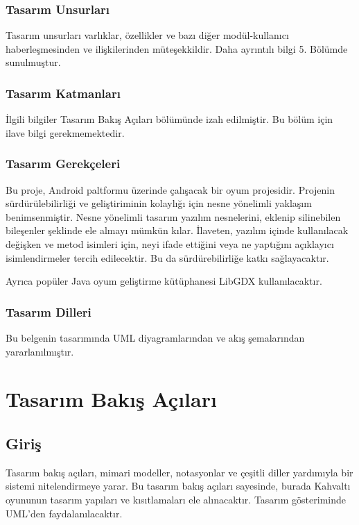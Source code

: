 \documentclass[12pt,a4paper]{article}
\begin{document}
   \subsubsection{Tasarım Unsurları}
   Tasarım unsurları varlıklar, özellikler ve bazı diğer modül-kullanıcı haberleşmesinden ve ilişkilerinden müteşekkildir. Daha ayrıntılı bilgi 5. Bölümde sunulmuştur.

   \subsubsection{Tasarım Katmanları}
   İlgili bilgiler Tasarım Bakış Açıları bölümünde izah edilmiştir. Bu bölüm için ilave bilgi gerekmemektedir.

   \subsubsection{Tasarım Gerekçeleri}
   Bu proje, Android paltformu üzerinde çalışacak bir oyum projesidir. Projenin sürdürülebilirliği ve geliştiriminin kolaylığı için nesne yönelimli yaklaşım benimsenmiştir. Nesne yönelimli tasarım yazılım nesnelerini, eklenip silinebilen bileşenler şeklinde ele almayı mümkün kılar. İlaveten, yazılım içinde kullanılacak değişken ve metod isimleri için, neyi ifade ettiğini veya ne yaptığını açıklayıcı isimlendirmeler tercih edilecektir. Bu da sürdürebilirliğe katkı sağlayacaktır.

   Ayrıca popüler Java oyum geliştirme kütüphanesi LibGDX kullanılacaktır.

   \subsubsection{Tasarım Dilleri}
   Bu belgenin tasarımında UML diyagramlarından ve akış şemalarından yararlanılmıştır.

   \section{Tasarım Bakış Açıları}

   \subsection{Giriş}
   Tasarım bakış açıları, mimari modeller, notasyonlar ve çeşitli diller yardımıyla bir sistemi nitelendirmeye yarar. Bu tasarım bakış açıları sayesinde, burada Kahvaltı oyununun tasarım yapıları ve kısıtlamaları ele alınacaktır. Tasarım gösteriminde UML’den faydalanılacaktır.
\end{document}
